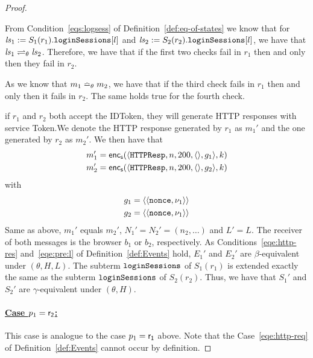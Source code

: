 \begin{proof}
\begin{itemize}
        From Condition~\ref{eqs:logsess} of 
        Definition~\ref{def:eq-of-states} we know that for 
        $\mathit{ls}_1 := S_1(r_1).\mathtt{loginSessions}[l]$ and 
        $\mathit{ls}_2 := S_2(r_2).\mathtt{loginSessions}[l]$, 
        we have that $\mathit{ls}_1 \rightleftharpoons_{\theta} \mathit{ls}_2$.
        Therefore, we have that if the first two checks fail in
        $r_1$ then and only then they fail in $r_2$.
  
        As we know that $m_1 \bumpeq_{\theta} m_2$, we have 
        that if the third check fails in $r_1$ then and only 
        then it fails in $r_2$. The same holds true for the 
        fourth check.
  
        if $r_1$ and $r_2$ both accept the IDToken, they will 
        generate HTTP responses with service Token.We denote 
        the HTTP response generated by $r_1$ as $m_1'$ and the
        one generated by $r_2$ as $m_2'$. We then have that
        \begin{align*}
          m_1' = \mathsf{enc}_\mathsf{s}(\langle\mathtt{HTTPResp},n,200,\langle\rangle,g_1\rangle,k) \\
          m_2' = \mathsf{enc}_\mathsf{s}(\langle\mathtt{HTTPResp},n,200,\langle\rangle,g_2\rangle,k)
        \end{align*}
        with
        \begin{align*}
          g_1 = \langle\langle\mathtt{nonce}, \nu_1\rangle\rangle \\
          g_2 = \langle\langle\mathtt{nonce}, \nu_1\rangle\rangle
        \end{align*}
        Same as above, $m_1'$ equals $m_2'$, $N_1' = N_2' = 
        (n_2, \dots)$ and $L' = L$. 
        The receiver of both messages is the browser $b_1$ or 
        $b_2$, respectively. As Conditions~\ref{eqe:http-res} 
        and~\ref{eqe:pre:l} of Definition~\ref{def:Events} hold, 
        $E_1'$ and $E_2'$ are $\beta$-equivalent under 
        $(\theta,H,L)$. The subterm $\mathtt{loginSessions}$ of 
        $S_1(r_1)$ is extended exactly the same as the subterm 
        $\mathtt{loginSessions}$ of $S_2(r_2)$. Thus, we have that 
        $S_1'$ and $S_2'$ are $\gamma$-equivalent under 
        $(\theta,H)$.
    \end{itemize}
  
    \paragraph{\underline{Case $p_1 = \mathsf{r_2}$:}} This case is
    analogue to the case $p_1 = \mathsf{r_1}$ above. Note that the
    Case~\ref{eqe:http-req} of Definition~\ref{def:Events} 
    cannot occur by definition.
  

\end{proof}
